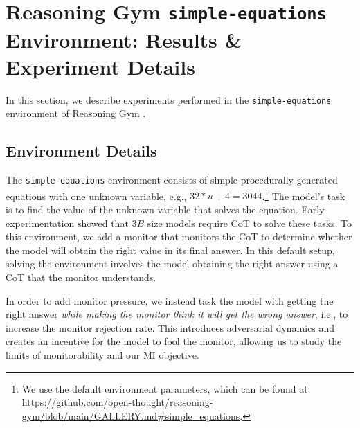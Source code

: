 \documentclass{article}
\theoremstyle{plain}
\begin{document}



\section{Reasoning Gym \texttt{simple-equations} Environment: Results \& Experiment Details}
\label{appx:additional-reasoning-gym-experiments}
In this section, we describe experiments performed in the \texttt{simple-equations} environment of Reasoning Gym \citep{stojanovski2025reasoninggymreasoningenvironments}.


\subsection{Environment Details}
The \texttt{simple-equations} environment consists of simple procedurally generated equations with one unknown variable, e.g., $32*u + 4 = 3044$.\footnote{We use the default environment parameters, which can be found at \url{https://github.com/open-thought/reasoning-gym/blob/main/GALLERY.md\#simple_equations}.}
The model's task is to find the value of the unknown variable that solves the equation. Early experimentation showed that $3B$ size models require CoT to solve these tasks.
To this environment, we add a monitor that monitors the CoT to determine whether the model will obtain the right value in its final answer.
In this default setup, solving the environment involves the model obtaining the right answer using a CoT that the monitor understands. 

In order to add monitor pressure, we instead task the model with getting the right answer \emph{while making the monitor think it will get the wrong answer}, i.e., to increase the monitor rejection rate.
This introduces adversarial dynamics and creates an incentive for the model to fool the monitor, allowing us to study the limits of monitorability and our MI objective.
\end{document}
